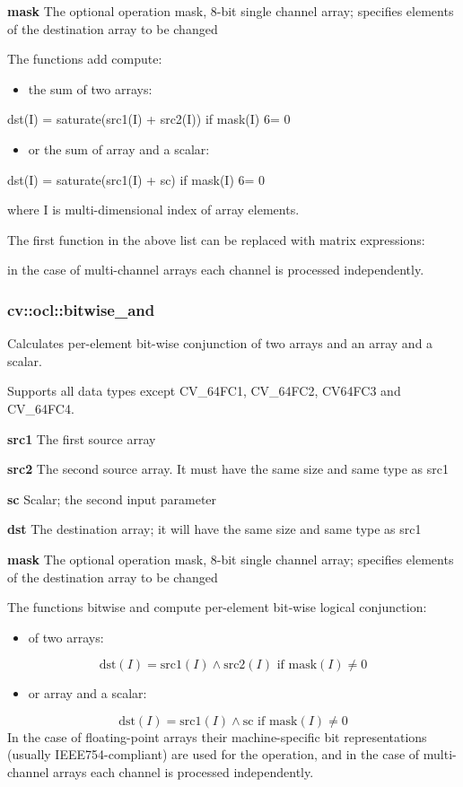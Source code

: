 \documentclass{article}
\begin{document}
\textbf{mask} The optional operation mask, 8-bit single channel array;
specifies elements of the destination array to be changed

The functions add compute:

\begin{itemize}
\item the sum of two arrays:
\end{itemize}
dst(I) = saturate(src1(I) + src2(I)) if mask(I) 6= 0

\begin{itemize}
\item or the sum of array and a scalar:
\end{itemize}
dst(I) = saturate(src1(I) + sc) if mask(I) 6= 0

where I is multi-dimensional index of array elements.

The first function in the above list can be replaced with matrix
expressions:

in the case of multi-channel arrays each channel is processed independently.

\newpage

\subsubsection{cv::ocl::bitwise{\_}and }
\label{subsubsec:mylabel6}
Calculates per-element bit-wise conjunction of two arrays and an array and a
scalar.

Supports all data types except CV{\_}64FC1, CV{\_}64FC2, CV64FC3 and
CV{\_}64FC4.

\textbf{src1 }The first source array

\textbf{src2 }The second source array. It must have the same size and same
type as src1

\textbf{sc }Scalar; the second input parameter

\textbf{dst }The destination array; it will have the same size and same type
as src1

\textbf{mask }The optional operation mask, 8-bit single channel array;
specifies elements of the destination array to be changed

The functions bitwise and compute per-element bit-wise logical conjunction:

\begin{itemize}
\item of two arrays:
\end{itemize}
\[
\mbox{dst}\left( I \right)=\mbox{src1}\left( I \right)\wedge
\mbox{src2}\left( I \right)\mbox{ if mask}\left( I \right)\ne 0
\]
\begin{itemize}
\item or array and a scalar:
\end{itemize}
\[
\mbox{dst}\left( I \right)=\mbox{src1}\left( I \right)\wedge \mbox{sc if
mask}\left( I \right)\ne 0
\]
In the case of floating-point arrays their machine-specific bit
representations (usually IEEE754-compliant) are used for the operation, and
in the case of multi-channel arrays each channel is processed independently.
\end{document}
